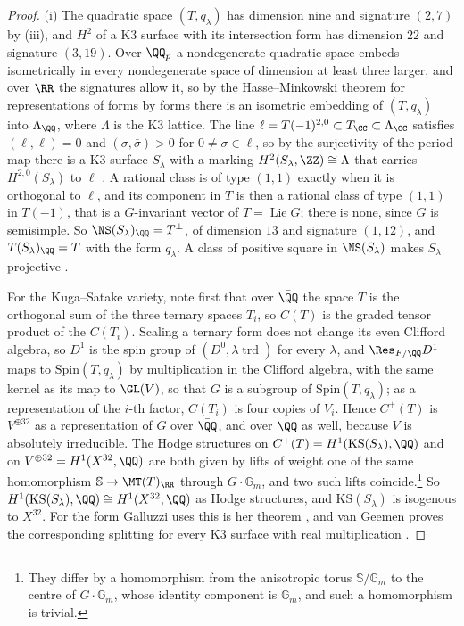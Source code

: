 \begin{proof}
(i) The quadratic space $(T,q_{\lambda})$ has dimension nine and signature
$(2,7)$ by (iii), and $H^{2}$ of a K3 surface with its
intersection form has dimension $22$ and signature $(3,19)$. Over $\QQ_{p}$
a nondegenerate quadratic space embeds isometrically in every nondegenerate
space of dimension at least three larger, and over $\RR$ the signatures
allow it, so by the Hasse--Minkowski theorem for representations of forms by
forms \cite[\S\S63, 66]{OMe00} there is an isometric embedding of
$(T,q_{\lambda})$ into $\Lambda_{\QQ}$, where $\Lambda$ is the K3 lattice.
The line $\ell=T(-1)^{2,0}\subset T_{\CC}\subset\Lambda_{\CC}$ satisfies
$(\ell,\ell)=0$ and $(\sigma,\bar{\sigma})>0$ for $0\ne\sigma\in\ell$, so by the
surjectivity of the period map there is a K3 surface $S_{\lambda}$ with a
marking $H^{2}(S_{\lambda},\ZZ)\cong\Lambda$ that carries
$H^{2,0}(S_{\lambda})$ to $\ell$ \cite[Chs.~6--7]{Huy16}. A rational class
is of type $(1,1)$ exactly when it is orthogonal to $\ell$, and its component
in $T$ is then a rational class of type $(1,1)$ in $T(-1)$, that is a
$G$-invariant vector of $T=\operatorname{Lie}G$; there is none, since $G$ is
semisimple. So $\NS(S_{\lambda})_{\QQ}=T^{\perp}$, of dimension $13$ and
signature $(1,12)$, and $T(S_{\lambda})_{\QQ}=T$ with the form $q_{\lambda}$.
A class of positive square in $\NS(S_{\lambda})$ makes $S_{\lambda}$
projective \cite[Ch.~8]{Huy16}.

For the Kuga--Satake variety, note first that over $\bar{\QQ}$ the space $T$
is the orthogonal sum of the three ternary spaces $T_{i}$, so $C(T)$ is the
graded tensor product of the $C(T_{i})$. Scaling a ternary form does not
change its even Clifford algebra, so $D^{1}$ is the spin group of
$(D^{0},\lambda\operatorname{trd})$ for every $\lambda$, and
$\Res_{F/\QQ}D^{1}$ maps to $\mathrm{Spin}(T,q_{\lambda})$ by multiplication
in the Clifford algebra, with the same kernel as its map to $\GL(V)$, so that
$G$ is a subgroup of $\mathrm{Spin}(T,q_{\lambda})$; as a representation of the $i$-th factor,
$C(T_{i})$ is four copies of $V_{i}$. Hence $C^{+}(T)$ is $V^{\oplus32}$ as a
representation of $G$ over $\bar{\QQ}$, and over $\QQ$ as well, because $V$ is
absolutely irreducible. The Hodge structures on $C^{+}(T)=H^{1}(\mathrm{KS}(S_{\lambda}),\QQ)$
and on $V^{\oplus32}=H^{1}(X^{32},\QQ)$ are both given by lifts of weight one of
the same homomorphism $\mathbb{S}\to\MT(T)_{\RR}$ through $G\cdot\mathbb{G}_{m}$, and
two such lifts coincide.\footnote{They differ by a homomorphism from the
anisotropic torus $\mathbb{S}/\mathbb{G}_{m}$ to the centre of
$G\cdot\mathbb{G}_{m}$, whose identity component is $\mathbb{G}_{m}$, and
such a homomorphism is trivial.} So
$H^{1}(\mathrm{KS}(S_{\lambda}),\QQ)\cong H^{1}(X^{32},\QQ)$ as Hodge
structures, and $\mathrm{KS}(S_{\lambda})$ is isogenous to $X^{32}$. For the
form Galluzzi uses this is her theorem \cite{Gal00}, and van Geemen proves the
corresponding splitting for every K3 surface with real multiplication
\cite{vG08}.


\end{proof}
